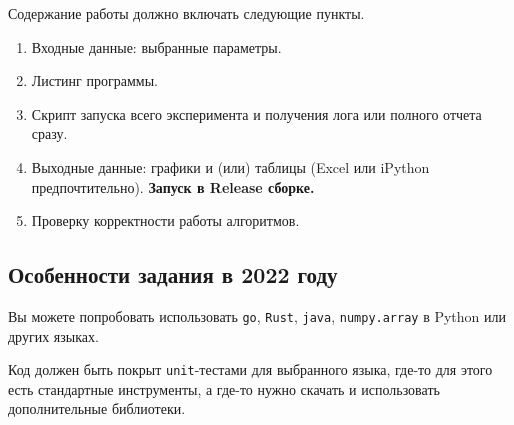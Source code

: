 Содержание работы должно включать следующие пункты.
\begin{enumerate}
    \item Входные данные: выбранные параметры.
    \item Листинг программы.
    \item Скрипт запуска всего эксперимента и получения лога или полного отчета сразу.
    \item Выходные данные: графики и (или) таблицы (Excel или iPython предпочтительно). \textbf{Запуск в Release сборке.}
    \item Проверку корректности работы алгоритмов.
\end{enumerate}

\subsection*{Особенности задания в 2022 году}
Вы можете попробовать использовать \texttt{go}, \texttt{Rust}, \texttt{java}, \texttt{numpy.array} в Python или других языках.

Код должен быть покрыт \texttt{unit}-тестами для выбранного языка, где-то для этого есть стандартные инструменты, а где-то нужно скачать и использовать дополнительные библиотеки.
